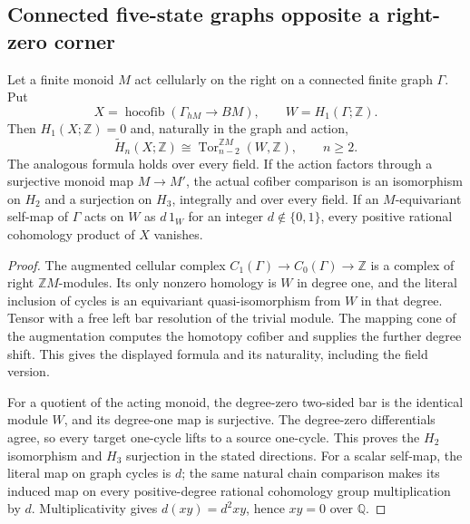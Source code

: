 \subsection{Connected five-state graphs opposite a right-zero corner}

\begin{lemma}
\label{C:connected-graph-cone-natural-Tor}
Let a finite monoid $M$ act cellularly on the right on a connected
finite graph $\Gamma$. Put
\[
 X=\operatorname{hocofib}(\Gamma_{hM}\longrightarrow BM),
 \qquad W=H_1(\Gamma;\mathbb Z).
\]
Then $H_1(X;\mathbb Z)=0$ and, naturally in the graph and action,
\[
 \widetilde H_n(X;\mathbb Z)
   \cong\operatorname{Tor}_{n-2}^{\mathbb ZM}(W,\mathbb Z),
       \qquad n\geq2.
\]
The analogous formula holds over every field.
If the action factors through a surjective monoid map $M\to M'$, the
actual cofiber comparison is an isomorphism on $H_2$ and a surjection
on $H_3$, integrally and over every field.
If an $M$-equivariant self-map of $\Gamma$ acts on $W$ as
$d\,1_W$ for an integer $d\notin\{0,1\}$, every positive rational
cohomology product of $X$ vanishes.
\end{lemma}
\begin{proof}
The augmented cellular complex
$C_1(\Gamma)\to C_0(\Gamma)\to\mathbb Z$ is a complex of
right $\mathbb ZM$-modules. Its only nonzero homology is $W$
in degree one, and the literal inclusion of cycles is an
equivariant quasi-isomorphism from $W$ in that degree.
Tensor with a free left bar resolution of the trivial module.
The mapping cone of the augmentation computes the homotopy
cofiber and supplies the further degree shift. This gives the
displayed formula and its naturality, including the field version.

For a quotient of the acting monoid, the degree-zero two-sided bar
is the identical module $W$, and its degree-one map is surjective.
The degree-zero differentials agree, so every target one-cycle lifts
to a source one-cycle. This proves the $H_2$ isomorphism and $H_3$
surjection in the stated directions.
For a scalar self-map, the literal map on graph cycles is $d$;
the same natural chain comparison makes its induced map on every
positive-degree rational cohomology group multiplication by $d$.
Multiplicativity gives $d(xy)=d^2xy$, hence $xy=0$ over $\mathbb Q$.
\end{proof}

